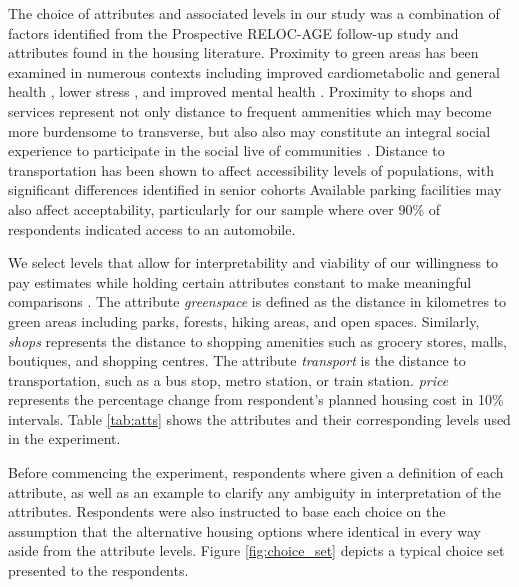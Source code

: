 \documentclass[3p,11pt ]{elsarticle}
\begin{document}
The choice of attributes and associated levels in our study was a combination of factors identified from the Prospective RELOC-AGE follow-up study and attributes found in the housing literature.
Proximity to green areas has been examined in numerous contexts including improved cardiometabolic and general health \citep{paquetAreAccessibilityCharacteristics2013,  maasGreenSpaceUrbanity2006},
lower stress \citep{nielsenGreenAreasAffect2007},
and improved mental health \citep{cohen-clineAccessGreenSpace2015,sturmProximityUrbanParks2014}.
Proximity to shops and services represent not only distance to frequent ammenities which may become more burdensome to transverse,
but also also may constitute an integral social experience to participate in the social live of communities
\citep{lucasMethodEvaluateEquitable2016}.
Distance to transportation has been shown to affect  accessibility levels of populations,
with significant differences identified in senior cohorts \citep{ricciardiExploringPublicTransport2015,hildebrandDimensionsElderlyTravel2003,alsnihMobilityAccessibilityExpectations2003}
Available parking facilities may also affect acceptability,
particularly for our sample where over 90\% of respondents indicated access to an automobile.

We select levels that allow for interpretability and viability of our willingness to pay estimates while holding certain attributes constant to make meaningful comparisons \citep{hensherAppliedChoiceAnalysis2015}.
The attribute \textit{greenspace} is defined as the distance in kilometres to green areas including parks, forests, hiking areas, and open spaces.
Similarly,
\textit{shops} represents the distance to shopping amenities such as grocery stores, malls, boutiques, and shopping centres.
The attribute \textit{transport} is the distance to transportation, such as a bus stop, metro station, or train station.
\textit{price} represents the percentage change from respondent's planned housing cost in 10\% intervals.
Table \ref{tab:atts}  shows the attributes and their corresponding levels used in the experiment.




Before commencing the experiment,
respondents where given a definition of each attribute, as well as an example to clarify any ambiguity in interpretation of the attributes.
Respondents were also instructed to base each choice on the assumption that the alternative housing options where identical in every way aside from the attribute levels.
Figure \ref{fig:choice_set} depicts a typical choice set presented to the respondents.
\end{document}
